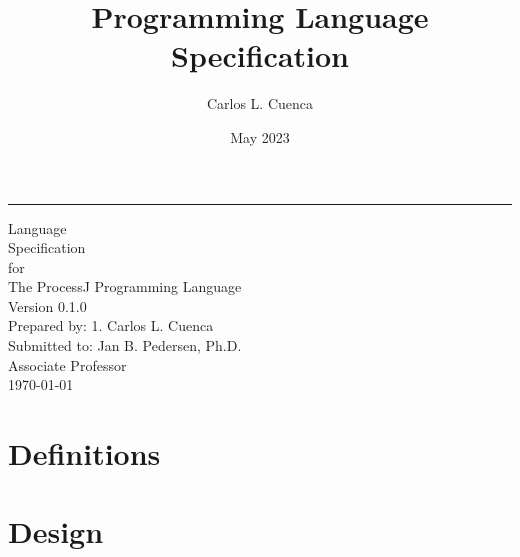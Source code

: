 \documentclass[12pt]{book}
\title{Programming Language Specification}
\author{Carlos L. Cuenca}
\date{May 2023}
\def\version{0.1.0}
\begin{document}

    \begin{flushright}
        \rule{12cm}{4pt}\vskip1cm
        \begin{bfseries}
            \Huge{Language\\ Specification}\\
            \vspace{0.8cm}
            for\\
            \vspace{0.8cm}
            The ProcessJ Programming Language\\
            \vspace{0.8cm}
            \LARGE{Version \version}\\
            \vspace{0.8cm}
            Prepared by: 1. Carlos L. Cuenca\\
            \vspace{0.8cm}
            Submitted to: Jan B. Pedersen, Ph.D. \\Associate Professor\\
            \vspace{0.8cm}
            \today\\
        \end{bfseries}
    \end{flushright}

    \tableofcontents


    \chapter{Definitions}


    \chapter{Design}
\end{document}
